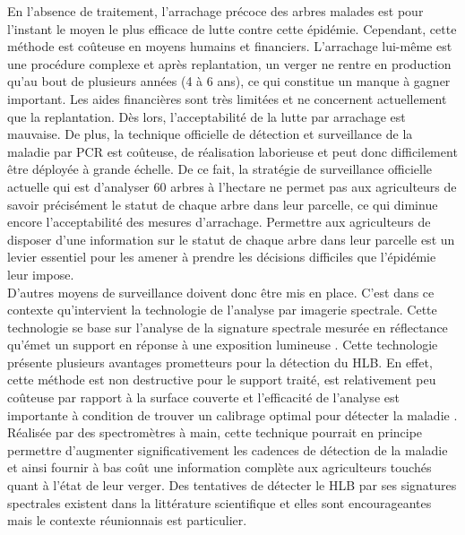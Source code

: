 \documentclass[
  11pt,
  french,
  a4paper,
  extrafontsizes,onecolumn,openright
  ]{memoir}
\begin{document}
En l'absence de traitement, l'arrachage précoce des arbres malades est pour l'instant le moyen le plus efficace de lutte contre cette épidémie. Cependant, cette méthode est coûteuse en moyens humains et financiers. L'arrachage lui-même est une procédure complexe et après replantation, un verger ne rentre en production qu'au bout de plusieurs années (4 à 6 ans), ce qui constitue un manque à gagner important. Les aides financières sont très limitées et ne concernent actuellement que la replantation. Dès lors, l'acceptabilité de la lutte par arrachage est mauvaise. De plus, la technique officielle de détection et surveillance de la maladie par PCR est coûteuse, de réalisation laborieuse et peut donc difficilement être déployée à grande échelle. De ce fait, la stratégie de surveillance officielle actuelle qui est d'analyser 60 arbres à l'hectare ne permet pas aux agriculteurs de savoir précisément le statut de chaque arbre dans leur parcelle, ce qui diminue encore l'acceptabilité des mesures d'arrachage. Permettre aux agriculteurs de disposer d'une information sur le statut de chaque arbre dans leur parcelle est un levier essentiel pour les amener à prendre les décisions difficiles que l'épidémie leur impose.\\
D'autres moyens de surveillance doivent donc être mis en place. C'est dans ce contexte qu'intervient la technologie de l'analyse par imagerie spectrale. Cette technologie se base sur l'analyse de la signature spectrale mesurée en réflectance qu'émet un support en réponse à une exposition lumineuse \autocite{sankaran_huanglongbing_2013}. Cette technologie présente plusieurs avantages prometteurs pour la détection du HLB. En effet, cette méthode est non destructive pour le support traité, est relativement peu coûteuse par rapport à la surface couverte et l'efficacité de l'analyse est importante à condition de trouver un calibrage optimal pour détecter la maladie \autocite{sankaran_visible-near_2011}. Réalisée par des spectromètres à main, cette technique pourrait en principe permettre d'augmenter significativement les cadences de détection de la maladie et ainsi fournir à bas coût une information complète aux agriculteurs touchés quant à l'état de leur verger. Des tentatives de détecter le HLB par ses signatures spectrales existent dans la littérature scientifique \autocite{sankaran_visible-near_2011} et elles sont encourageantes mais le contexte réunionnais est particulier.
\end{document}
